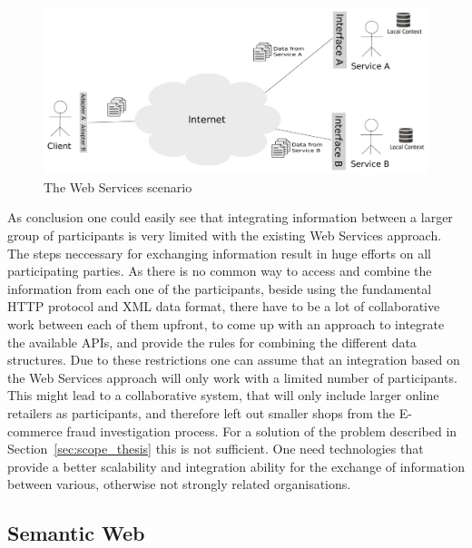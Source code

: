 \begin{figure}[H]
  \centering
  \includegraphics[width=0.9\columnwidth]{images/web-services-scenario.pdf}
  \caption{The Web Services scenario}
\label{fig:web_services_scenario}
\end{figure}

As conclusion one could easily see that integrating information between a larger group of participants is very limited with the existing Web Services approach. The steps neccessary for exchanging information result in huge efforts on all participating parties. As there is no common way to access and combine the information from each one of the participants, beside using the fundamental \gls{HTTP} protocol and \gls{XML} data format, there have to be a lot of collaborative work between each of them upfront, to come up with an approach to integrate the available \gls{API}s, and provide the rules for combining the different data structures. Due to these restrictions one can assume that an integration based on the Web Services approach will only work with a limited number of participants. This might lead to a collaborative system, that will only include larger online retailers as participants, and therefore left out smaller shops from the \gls{E-commerce} fraud investigation process. For a solution of the problem described in Section~\ref{sec:scope_thesis} this is not sufficient. One need technologies that provide a better scalability and integration ability for the exchange of information between various, otherwise not strongly related organisations.


\subsection{Semantic Web}
\label{subsec:web_data}

